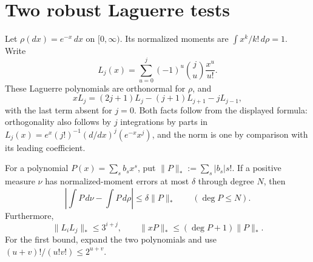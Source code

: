 \documentclass[11pt]{article}
\begin{document}
\section*{Two robust Laguerre tests}
Let $\rho(dx)=e^{-x}\,dx$ on $[0,\infty)$. Its normalized moments are
$\int x^k/k!\,d\rho=1$. Write
\[
 L_j(x)=\sum_{u=0}^j(-1)^u\binom ju\frac{x^u}{u!}.
\]
These Laguerre polynomials are orthonormal for $\rho$, and
\begin{equation}\label{recurrence}
 xL_j=(2j+1)L_j-(j+1)L_{j+1}-jL_{j-1},
\end{equation}
with the last term absent for $j=0$. Both facts follow from the displayed
formula: orthogonality also follows by $j$ integrations by parts in
$L_j(x)=e^x(j!)^{-1}(d/dx)^j(e^{-x}x^j)$, and the norm is one by
comparison with its leading coefficient.

For a polynomial $P(x)=\sum_s b_sx^s$, put
$\|P\|_*:=\sum_s|b_s|s!$. If a positive measure $\nu$ has
normalized-moment errors at most $\delta$ through degree $N$, then
\begin{equation}\label{error}
 \left|\int P\,d\nu-\int P\,d\rho\right|
 \le\delta\|P\|_*\qquad(\deg P\le N).
\end{equation}
Furthermore,
\begin{equation}\label{norms}
 \|L_iL_j\|_*\le3^{i+j},\qquad
 \|xP\|_*\le(\deg P+1)\|P\|_*.
\end{equation}
For the first bound, expand the two polynomials and use
$(u+v)!/(u!v!)\le2^{u+v}$.
\end{document}
